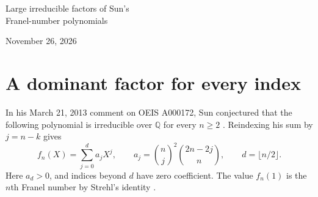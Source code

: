 \documentclass[10pt]{article}
\newcommand{\Q}{\mathbb Q}
\begin{document}
\begin{center}
{\LARGE Large irreducible factors of Sun's\\[2pt] Franel-number polynomials\par}
\medskip November 26, 2026
\end{center}
\begin{abstract}
For a family of binomial polynomials conjectured by Zhi-Wei Sun to be irreducible, we prove irreducibility at four indices around each prime $p$, namely $p-2,p-1,p,p+1$ in the domain $n\ge2$. At every index there is a unique irreducible factor of degree greater than half the degree of the polynomial. The ratio of these two degrees tends to one. Finite-field certificates also establish irreducibility at every index through 2048. The proofs use coefficient valuations at the nearest larger prime and, at prime or prime-successor indices, a second reduction of the reciprocal polynomial.
\end{abstract}

\section{A dominant factor for every index}
In his March 21, 2013 comment on OEIS A000172, Sun conjectured that the following polynomial is irreducible over $\Q$ for every $n\ge2$ \cite{sun}. Reindexing his sum by $j=n-k$ gives
\[
 f_n(X)=\sum_{j=0}^{d}a_jX^j,\qquad
 a_j=\binom nj^2\binom{2n-2j}{n},\qquad d=\lfloor n/2\rfloor.
\]
Here $a_d>0$, and indices beyond $d$ have zero coefficient. The value $f_n(1)$ is the $n$th Franel number by Strehl's identity \cite{strehl}.
\end{document}
